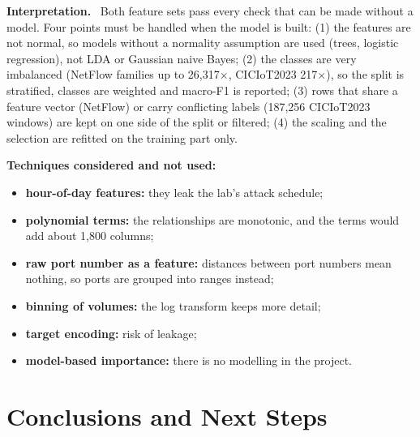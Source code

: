 \documentclass[12pt,a4paper]{article}
\newenvironment{interp}{\par\smallskip\noindent\begin{minipage}{\linewidth}\setlength{\parskip}{5pt}\textbf{\color{navy}Interpretation.}\ }{\end{minipage}\par\medskip}
\newenvironment{keep}{\par\noindent\begin{minipage}{\linewidth}\setlength{\parskip}{5pt}}{\end{minipage}\par\medskip}
\begin{document}
\begin{interp}
Both feature sets pass every check that can be made without a model. Four points must be handled when the model is
built: (1) the features are not normal, so models without a normality assumption are used (trees, logistic
regression), not LDA or Gaussian naive Bayes; (2) the classes are very imbalanced (NetFlow families up to 26,317$\times$,
CICIoT2023 217$\times$), so the split is stratified, classes are weighted and macro-F1 is reported; (3) rows that share a
feature vector (NetFlow) or carry conflicting labels (187,256 CICIoT2023 windows) are kept on one side of the split or
filtered; (4) the scaling and the selection are refitted on the training part only.
\end{interp}

\begin{keep}
\textbf{Techniques considered and not used:}
\begin{itemize}
  \item \textbf{hour-of-day features:} they leak the lab's attack schedule;
  \item \textbf{polynomial terms:} the relationships are monotonic, and the terms would add about 1,800 columns;
  \item \textbf{raw port number as a feature:} distances between port numbers mean nothing, so ports are grouped
        into ranges instead;
  \item \textbf{binning of volumes:} the log transform keeps more detail;
  \item \textbf{target encoding:} risk of leakage;
  \item \textbf{model-based importance:} there is no modelling in the project.
\end{itemize}
\end{keep}

\section{Conclusions and Next Steps}
\end{document}

